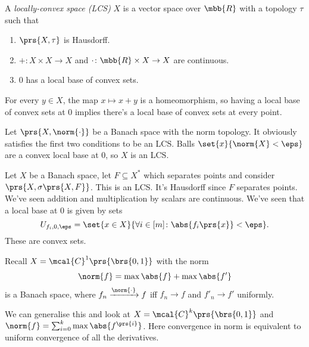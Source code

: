 \documentclass[10pt, twoside]{book}
\begin{document}
\begin{definition}
A \emph{locally-convex space (LCS)} $X$ is a vector space over $\mbb{R}$ with a topology $\tau$ such that
\begin{enumerate}
\item $\prs{X,\tau}$ is Hausdorff.
\item $+ \colon X \times X \to X$ and $\cdot \colon \mbb{R} \times X \to X$ are continuous.
\item $0$ has a local base of convex sets.
\end{enumerate}
\end{definition}

\begin{remark}
For every $y \in X$, the map $x \mapsto x + y$ is a homeomorphism, so having a local base of convex sets at $0$ implies there's a local base of convex sets at every point.
\end{remark}

\begin{example}
Let $\prs{X, \norm{\cdot}}$ be a Banach space with the norm topology. It obviously satisfies the first two conditions to be an LCS. Balls $\set{x}{\norm{X} < \eps}$ are a convex local base at $0$, so $X$ is an LCS.
\end{example}

\begin{example}
Let $X$ be a Banach space, let $F \subseteq X^*$ which separates points and consider $\prs{X, \sigma\prs{X,F}}$. This is an LCS. It's Hausdorff since $F$ separates points. We've seen addition and multiplication by scalars are continuous. We've seen that a local base at $0$ is given by sets
\[U_{f_i, 0, \eps} = \set{x \in X}{\forall i \in [m] \colon \abs{f_i\prs{x}} < \eps} \text{.}\]
These are convex sets.
\end{example}

\begin{example}
Recall $X = \mcal{C}^1\prs{\brs{0,1}}$ with the norm
\[\norm{f} = \max \abs{f} + \max \abs{f'}\]
is a Banach space, where $f_n \xrightarrow{\norm{\cdot}} f$ iff $f_n \to f$ and $f'_n \to f'$ uniformly.

We can generalise this and look at $X = \mcal{C}^k\prs{\brs{0,1}}$ and $\norm{f} = \sum_{i = 0}^k \max \abs{f^{\prs{i}}}$. Here convergence in norm is equivalent to uniform convergence of all the derivatives.
\end{example}
\end{document}

